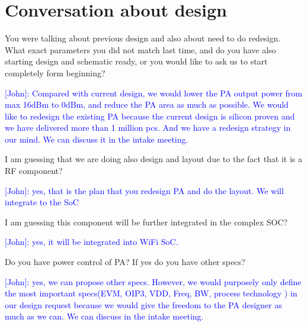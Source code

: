 \documentclass{article}
\begin{document}




\section{Conversation about design}

You were talking about previous design and also about need to do redesign. What exact parameters you did not match last time, and do you have also starting design and schematic ready, or you would like to ask us to start completely form beginning?

\textcolor{blue}{[John]: Compared with current design, we would lower the PA output power from max 16dBm to 0dBm, and reduce the PA area as much as possible. We would like to redesign the existing PA because the current design is silicon proven and we have delivered more than 1 million pcs. And we have a redesign strategy in our mind. We can discuss it in the intake meeting.}

I am guessing that we are doing also design and layout due to the fact that it is a RF component?

\textcolor{blue}{[John]:  yes, that is the plan that  you redesign PA and do the layout. We will integrate to the SoC }

I am guessing this component will be further integrated in the complex SOC? 

\textcolor{blue}{[John]: yes, it will be integrated into WiFi SoC. }

Do you have power control of PA?  If yes do you have other specs? 

\textcolor{blue}{[John]: yes, we can propose other specs. However, we would purposely only define the most important specs(EVM, OIP3, VDD, Freq, BW, process technology ) in our design request because we would give the freedom to the PA designer as much as we can. We can discuss  in the intake meeting. }
\end{document}

